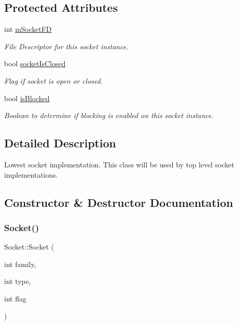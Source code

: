 \subsection*{Protected Attributes}
\begin{DoxyCompactItemize}
\item 
\mbox{\label{classSocket_a1c7a05cd7a83e7842d67ad81d596b027}} 
int \hyperlink{classSocket_a1c7a05cd7a83e7842d67ad81d596b027}{m\+Socket\+FD}
\begin{DoxyCompactList}\small\item\em File Descriptor for this socket instance. \end{DoxyCompactList}\item 
\mbox{\label{classSocket_a65d2d945a320889927555dc639daa0db}} 
bool \hyperlink{classSocket_a65d2d945a320889927555dc639daa0db}{socket\+Is\+Closed}
\begin{DoxyCompactList}\small\item\em Flag if socket is open or closed. \end{DoxyCompactList}\item 
\mbox{\label{classSocket_acba7450444a1ff7484abcad45d3a2395}} 
bool \hyperlink{classSocket_acba7450444a1ff7484abcad45d3a2395}{is\+Blocked}
\begin{DoxyCompactList}\small\item\em Boolean to determine if blocking is enabled on this socket instance. \end{DoxyCompactList}\end{DoxyCompactItemize}


\subsection{Detailed Description}
Lowest socket implementation. This class will be used by top level socket implementations. 

\subsection{Constructor \& Destructor Documentation}
\mbox{\label{classSocket_aa2d2ef4b12252e237f8e8d47c8000a8e}} 
\subsubsection{\texorpdfstring{Socket()}{Socket()}}
{\footnotesize\ttfamily Socket\+::\+Socket (\begin{DoxyParamCaption}\item[{int}]{family,  }\item[{int}]{type,  }\item[{int}]{flag }\end{DoxyParamCaption})}




